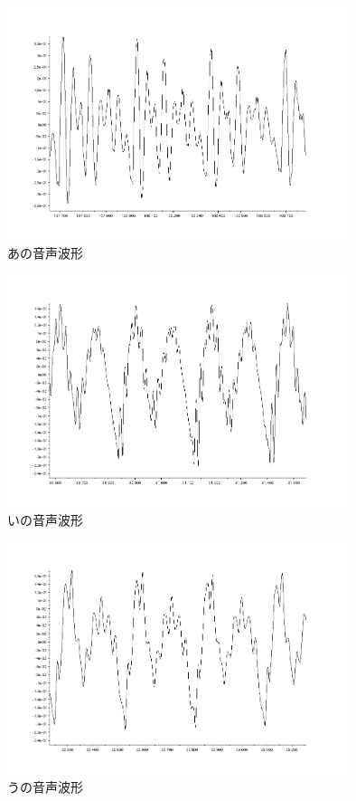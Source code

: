 \documentclass[12pt,oneside]{sotsuken_paper}
\begin{document}
\begin{figure}[htbp]
\begin{center}
\includegraphics[width=100mm]{img/a.png}
\caption{あの音声波形}
\label{fig:voice-a}
\end{center}
\end{figure}


\begin{figure}[htbp]
\begin{center}
\includegraphics[width=100mm]{img/i.png}
\caption{いの音声波形}
\label{fig:voice-i}
\end{center}
\end{figure}


\begin{figure}[htbp]
\begin{center}
\includegraphics[width=100mm]{img/u.png}
\caption{うの音声波形}
\label{fig:voice-u}
\end{center}
\end{figure}
\end{document}
